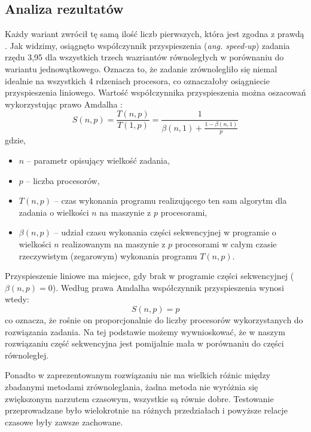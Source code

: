 \documentclass[12pt, twoside, hidelinks, a4paper]{article}
\begin{document}
\subsection{Analiza rezultatów}
Każdy wariant zwrócił tę samą ilość liczb pierwszych, która jest zgodna z prawdą \cite{c3}. Jak widzimy, osiągnęto współczynnik przyspieszenia (\textit{ang. speed-up}) zadania rzędu 3,95 dla wszystkich trzech wazriantów równoległych w porównaniu do wariantu jednowątkowego. Oznacza to, że zadanie zrównolegliło się niemal idealnie na wszystkich 4 rdzeniach procesora, co oznaczałoby osiągniecie przyspieszenia liniowego. Wartość współczynnika przyspieszenia można oszacowań wykorzystując prawo Amdalha \cite{c4}:
\begin{equation}
S(n,p)=\frac{T(n,p)}{T(1,p)}=\frac{1}{\beta(n,1)+\frac{1-\beta(n,1)}{p}}
\end{equation}
gdzie,
\begin{itemize}
\item $n$ – parametr opisujący wielkość zadania,
\item $p$ – liczba procesorów,
\item $T(n, p)$ – czas wykonania programu realizującego ten sam algorytm dla zadania o wielkości $n$ na maszynie z $p$ procesorami,
\item $\beta(n, p)$ – udział czasu wykonania części sekwencyjnej w programie o wielkości $n$ realizowanym na maszynie z $p$ procesorami w całym czasie rzeczywistym (zegarowym) wykonania programu $T(n, p)$.
\end{itemize}
Przyspieszenie liniowe ma miejsce, gdy brak w programie części sekwencyjnej (\textit{$\beta(n, p) = 0$}). Według prawa Amdalha współczynnik przyspieszenia wynosi wtedy:
\begin{equation}
S(n, p) = p
\end{equation}
co oznacza, że rośnie on proporcjonalnie do liczby procesorów wykorzystanych do rozwiązania zadania. Na tej podstawie możemy wywnioskować, że w naszym rozwiązaniu część sekwencyjna jest pomijalnie mała w porównaniu do części równoległej.

Ponadto w zaprezentowanym rozwiązaniu nie ma wielkich różnic między zbadanymi metodami zrównoleglania, żadna metoda nie wyróżnia się zwiększonym narzutem czasowym, wszystkie są równie dobre. Testowanie przeprowadzane było wielokrotnie na różnych przedziałach i powyższe relacje czasowe były zawsze zachowane.

\printbibliography
\end{document}
